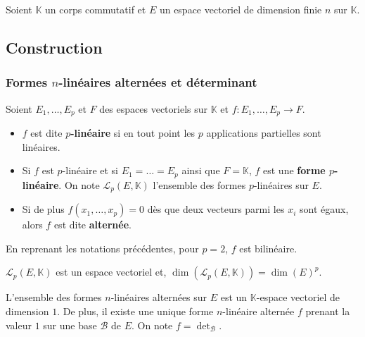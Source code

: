 




  Soient $\mathbb{K}$ un corps commutatif et $E$ un espace vectoriel de dimension finie $n$ sur $\mathbb{K}$.

  \subsection{Construction}

  \subsubsection{Formes \texorpdfstring{$n$}{n}-linéaires alternées et déterminant}


  \begin{definition}
    Soient $E_1, \dots, E_p$ et $F$ des espaces vectoriels sur $\mathbb{K}$ et $f : E_1, \dots, E_p \rightarrow F$.
    \begin{itemize}
      \item $f$ est dite \textbf{$p$-linéaire} si en tout point les $p$ applications partielles sont linéaires.
      \item Si $f$ est $p$-linéaire et si $E_1 = \dots = E_p$ ainsi que $F = \mathbb{K}$, $f$ est une \textbf{forme $p$-linéaire}. On note $\mathcal{L}_p(E, \mathbb{K})$ l'ensemble des formes $p$-linéaires sur $E$.
      \item Si de plus $f(x_1, \dots, x_p) = 0$ dès que deux vecteurs parmi les $x_i$ sont égaux, alors $f$ est dite \textbf{alternée}.
    \end{itemize}
  \end{definition}

  \begin{example}
    En reprenant les notations précédentes, pour $p = 2$, $f$ est bilinéaire.
  \end{example}

  \begin{proposition}
    $\mathcal{L}_p(E, \mathbb{K})$ est un espace vectoriel et, $\operatorname{dim}(\mathcal{L}_p(E, \mathbb{K})) = \operatorname{dim}(E)^p$.
  \end{proposition}

  \begin{theorem}
    L'ensemble des formes $n$-linéaires alternées sur $E$ est un $\mathbb{K}$-espace vectoriel de dimension $1$. De plus, il existe une unique forme $n$-linéaire alternée $f$ prenant la valeur $1$ sur une base $\mathcal{B}$ de $E$. On note $f = \det_{\mathcal{B}}$.
  \end{theorem}

